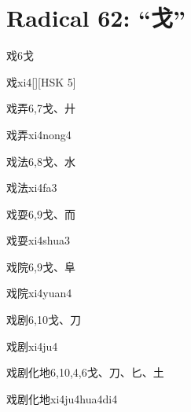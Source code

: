 
\section*{Radical 62: ``⼽''}

\begin{entry}{戏}{6}{⼽}
  \begin{phonetics}{戏}{xi4}[][HSK 5]
  \end{phonetics}
\end{entry}

\begin{entry}{戏弄}{6,7}{⼽、⼶}
  \begin{phonetics}{戏弄}{xi4nong4}
  \end{phonetics}
\end{entry}

\begin{entry}{戏法}{6,8}{⼽、⽔}
  \begin{phonetics}{戏法}{xi4fa3}
  \end{phonetics}
\end{entry}

\begin{entry}{戏耍}{6,9}{⼽、⽽}
  \begin{phonetics}{戏耍}{xi4shua3}
  \end{phonetics}
\end{entry}

\begin{entry}{戏院}{6,9}{⼽、⾩}
  \begin{phonetics}{戏院}{xi4yuan4}
  \end{phonetics}
\end{entry}

\begin{entry}{戏剧}{6,10}{⼽、⼑}
  \begin{phonetics}{戏剧}{xi4ju4}
  \end{phonetics}
\end{entry}

\begin{entry}{戏剧化地}{6,10,4,6}{⼽、⼑、⼔、⼟}
  \begin{phonetics}{戏剧化地}{xi4ju4hua4di4}
  \end{phonetics}
\end{entry}


